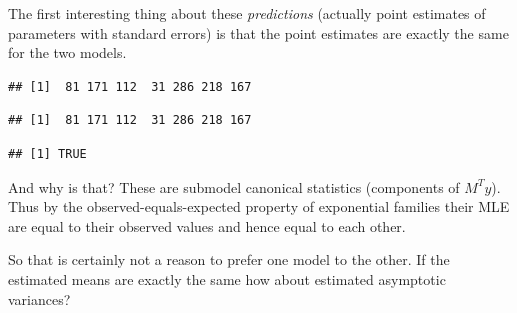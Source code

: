 \documentclass[
  ignorenonframetext,
]{beamer}
\newenvironment{Shaded}{\begin{snugshade}}{\end{snugshade}}
\newcommand{\FunctionTok}[1]{\textcolor[rgb]{0.00,0.00,0.00}{#1}}
\newcommand{\NormalTok}[1]{#1}
\newcommand{\SpecialCharTok}[1]{\textcolor[rgb]{0.00,0.00,0.00}{#1}}
\begin{document}
\begin{frame}[fragile]{}
\protect\hypertarget{section-23}{}
The first interesting thing about these \emph{predictions} (actually
point estimates of parameters with standard errors) is that the point
estimates are exactly the same for the two models.

\vspace{12pt}
\tiny

\begin{Shaded}
\end{Shaded}

\begin{verbatim}
## [1]  81 171 112  31 286 218 167
\end{verbatim}

\begin{Shaded}
\end{Shaded}

\begin{verbatim}
## [1]  81 171 112  31 286 218 167
\end{verbatim}

\begin{Shaded}
\end{Shaded}

\begin{verbatim}
## [1] TRUE
\end{verbatim}

\vspace{12pt}
\normalsize

And why is that? These are submodel canonical statistics (components of
\(M^Ty\)). Thus by the observed-equals-expected property of exponential
families their MLE are equal to their observed values and hence equal to
each other.

So that is certainly not a reason to prefer one model to the other. If
the estimated means are exactly the same how about estimated asymptotic
variances?
\end{frame}
\end{document}
